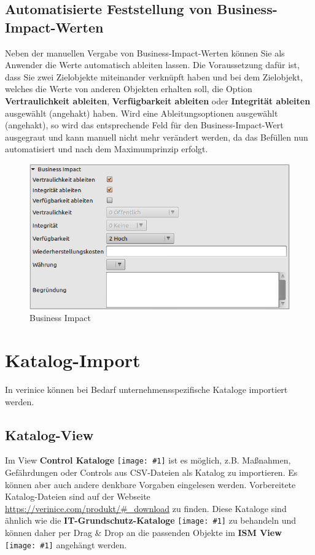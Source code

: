 \documentclass[a4paper,10pt]{book}
\newcommand{\icon}[1]{\texttt{[image: \#1]}}
\begin{document}
\subsection{Automatisierte Feststellung von Business-Impact-Werten} \label{Automatisierte Feststellung von Business-Impact-Werten}
Neben der manuellen Vergabe von Business-Impact-Werten können Sie als Anwender die Werte automatisch ableiten lassen.
Die Voraussetzung dafür ist, dass Sie zwei Zielobjekte miteinander verknüpft haben und bei dem Zielobjekt, welches die Werte von anderen
Objekten erhalten soll, die Option \textbf{Vertraulichkeit ableiten}, \textbf{Verfügbarkeit ableiten} oder \textbf{Integrität ableiten} ausgewählt (angehakt) haben.
Wird eine Ableitungsoptionen ausgewählt (angehakt), so wird das entsprechende Feld für den Business-Impact-Wert ausgegraut und kann manuell
nicht mehr verändert werden, da das Befüllen nun automatisiert und nach dem Maximumprinzip erfolgt.
\newline
\begin{figure}[htb!]
  \centering
  \includegraphics[scale=.5]{Screenshot/Business_Impact.png}
  \caption{\label{Business Impact} Business Impact}
\end{figure}
\newline

\section{Katalog-Import}
In verinice können bei Bedarf unternehmensspezifische Kataloge importiert werden.

\subsection{Katalog-View}
Im View \textbf{Control Kataloge}
\icon{Icon/Control_Kataloge.png} ist es möglich, z.B.
Maßnahmen, Gefährdungen oder Controls aus CSV-Dateien als Katalog zu
importieren. Es können aber auch andere denkbare Vorgaben eingelesen werden.
Vorbereitete Katalog-Dateien sind auf der Webseite
\url{https://verinice.com/produkt/#_download} zu finden. Diese Kataloge sind
ähnlich wie die \textbf{IT-Grundschutz-Kataloge}
\icon{Icon/GS_Kataloge.png} zu behandeln und können daher
per Drag \& Drop an die passenden Objekte im \textbf{ISM View}
\icon{Icon/Informationssicherheitsmodell.png} angehängt
werden.
\end{document}
